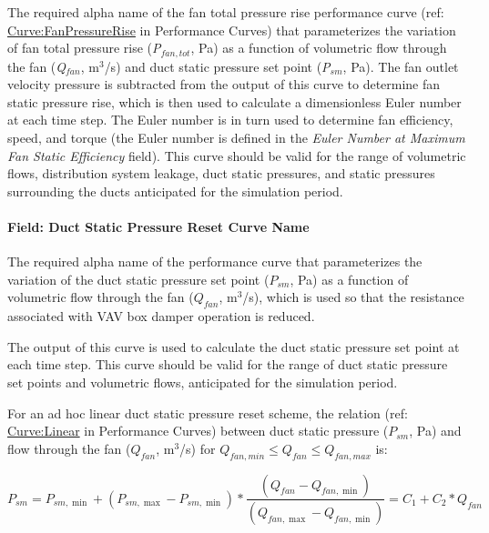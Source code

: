 The required alpha name of the fan total pressure rise performance curve (ref: \hyperref[curvefanpressurerise]{Curve:FanPressureRise} in Performance Curves) that parameterizes the variation of fan total pressure rise (\emph{P\(_{fan,tot}\)}, Pa) as a function of volumetric flow through the fan (\emph{Q\(_{fan}\)}, m\(^{3}\)/s) and duct static pressure set point (\emph{P\(_{sm}\)}, Pa). The fan outlet velocity pressure is subtracted from the output of this curve to determine fan static pressure rise, which is then used to calculate a dimensionless Euler number at each time step. The Euler number is in turn used to determine fan efficiency, speed, and torque (the Euler number is defined in the \emph{Euler Number at Maximum Fan Static Efficiency} field). This curve should be valid for the range of volumetric flows, distribution system leakage, duct static pressures, and static pressures surrounding the ducts anticipated for the simulation period.

\paragraph{Field: Duct Static Pressure Reset Curve Name}\label{field-duct-static-pressure-reset-curve-name}

The required alpha name of the performance curve that parameterizes the variation of the duct static pressure set point (\(P_{sm}\), Pa) as a function of volumetric flow through the fan (\(Q_{fan}\), m\(^{3}\)/s), which is used so that the resistance associated with VAV box damper operation is reduced.

The output of this curve is used to calculate the duct static pressure set point at each time step. This curve should be valid for the range of duct static pressure set points and volumetric flows, anticipated for the simulation period.

For an ad hoc linear duct static pressure reset scheme, the relation (ref: \hyperref[curvelinear]{Curve:Linear} in Performance Curves) between duct static pressure (\(P_{sm}\), Pa) and flow through the fan (\(Q_{fan}\), m\(^{3}\)/s) for \(Q_{fan,min} \le Q_{fan} \le Q_{fan,max}\) is:

\begin{equation}
P_{sm} = P_{sm,\min } + \left( P_{sm,\max } - P_{sm,\min } \right) * \frac{{\left( {{Q_{fan}} - {Q_{fan,\min }}} \right)}}{{\left( {{Q_{fan,\max }} - {Q_{fan,\min }}} \right)}} = {C_1} + {C_2}*{Q_{fan}}
\end{equation}

